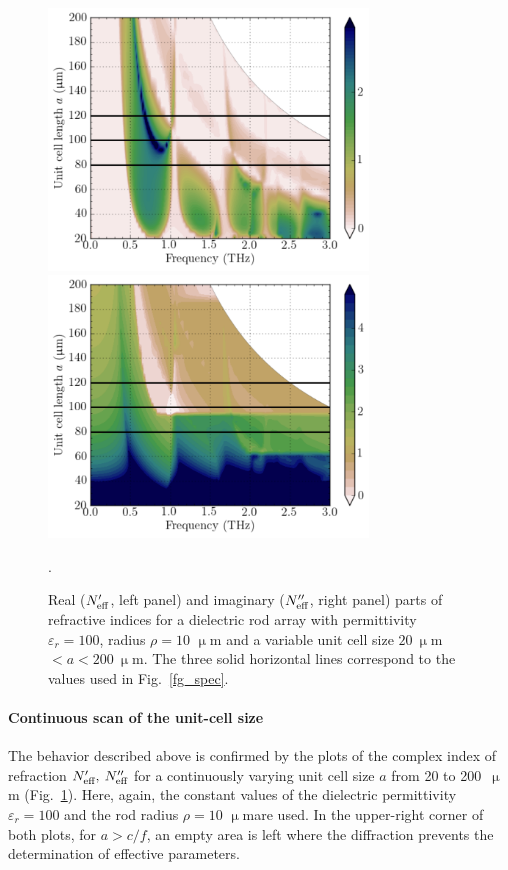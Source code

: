 \documentclass[letterpaper,12pt]{report}
\newcommand{\um}{\mbox{$\upmu$m}}
\begin{document}
\begin{figure}[h]\centering
    \includegraphics[width=8.5cm]{img/ERods_eps100_spacingscan_Nim.pdf}
    \includegraphics[width=8.5cm]{img/ERods_eps100_spacingscan_Nre.pdf}
\caption{Real ($N_{\text{eff} }'$, left panel) and imaginary ($N_{\text{eff} }''$, right panel) parts of
refractive indices for a dielectric rod array with permittivity $\varepsilon_r =100$,
radius $\rho = 10$ $\upmu$m and a variable unit cell size $20\:\upmu$m $<a<200\:\upmu$m. 
The three solid horizontal lines correspond to the values used in Fig.~\ref{fg_spec}.}
\label{fg_spacingscan100}. 

\end{figure}

\paragraph{Continuous scan of the unit-cell size}
The behavior described above is confirmed by the plots of the complex index of refraction
$N_{\text{eff} }',\: N_{\text{eff} }''$ for a continuously varying unit cell size $a$ from 20 to 200~$\upmu$m
(Fig.~\ref{fg_spacingscan100}). Here, again, the constant values of the dielectric
permittivity $\varepsilon_r=100$ and the rod radius $\rho=10$ \um are used. In the
upper-right corner of both plots, for $a>c/f$, an empty area is left where the
diffraction prevents the determination of effective parameters. 
\end{document}
